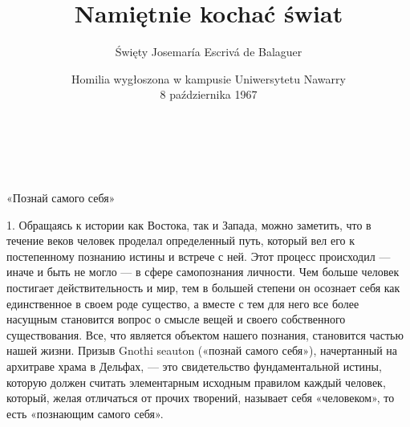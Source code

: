 \documentclass[a5paper,10pt]{article}
\title{\huge{Namiętnie kochać świat}}
\author{Święty Josemaría Escrivá de Balaguer}
\date{Homilia wygłoszona w kampusie Uniwersytetu Nawarry\\[1ex] 8 października 1967}
\newcommand\blankpage{%
    \null
    \thispagestyle{empty}%
    \addtocounter{page}{-1}%
    \newpage}
\begin{document}


\makeatletter
    \begin{titlepage}
        \begin{center}
            \vspace*{0.5cm} %
            {\huge \scshape  \bfseries  \@title }\\[2ex] 
            {\large  \@author}\\[4ex]
            \vspace*{1.5cm}
            \vfill
            {\normalsize \@date}
        \end{center}
    \end{titlepage}
\makeatother


\newpage

\pagestyle{empty}

 \vspace*{\fill}


    
    
	


\newpage


\setcounter{page}{1} %
\pagestyle{fancy}
«Познай самого себя»

1. Обращаясь к истории как Востока, так и Запада, можно заметить, что в течение
веков человек проделал определенный путь, который вел его к постепенному
познанию истины и встрече с ней. Этот процесс происходил — иначе и быть не
могло — в сфере самопознания личности. Чем больше человек постигает
действительность и мир, тем в большей степени он осознает себя как единственное
в своем роде существо, а вместе с тем для него все более насущным становится
вопрос о смысле вещей и своего собственного существования. Все, что является
объектом нашего познания, становится частью нашей жизни. Призыв Gnothi seauton
(«познай самого себя»), начертанный на архитраве храма в Дельфах, — это
свидетельство фундаментальной истины, которую должен считать элементарным
исходным правилом каждый человек, который, желая отличаться от прочих творений,
называет себя «человеком», то есть «познающим самого себя».
\end{document}

